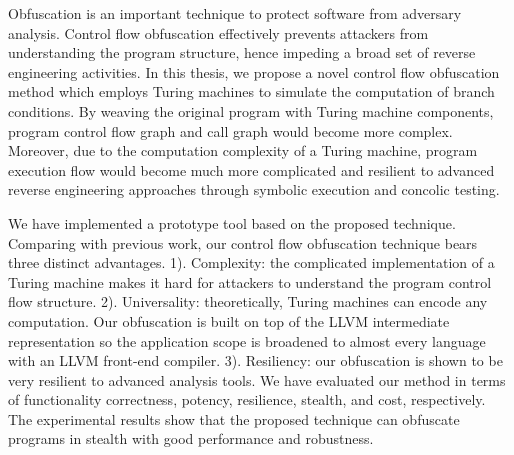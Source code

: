 


Obfuscation is an important technique to protect software from adversary
analysis. Control flow obfuscation effectively prevents attackers from
understanding the program structure, hence impeding a broad set of reverse
engineering activities. In this thesis, we propose a novel control flow
obfuscation method which employs Turing machines to simulate the computation of
branch conditions. By weaving the original program with Turing machine
components, program control flow graph and call graph would become more complex.
Moreover, due to the computation complexity of a Turing machine, program
execution flow would become much more complicated and resilient to advanced
reverse engineering approaches through symbolic execution and concolic testing.
%

We have implemented a prototype tool based on the proposed technique. Comparing with
previous work, our control flow obfuscation technique bears three distinct
advantages. 1). Complexity: the complicated implementation of a Turing machine
makes it hard for attackers to understand the program control flow structure.
2). Universality: theoretically, Turing machines can encode any computation. Our
obfuscation is built on top of the LLVM intermediate representation so the
application scope is broadened to almost every language with an LLVM front-end
compiler. 3). Resiliency: our obfuscation is shown to be very resilient to
advanced analysis tools. We have evaluated our method in terms of functionality
correctness, potency, resilience, stealth, and cost, respectively. The
experimental results show that the proposed technique can obfuscate programs in
stealth with good performance and robustness.